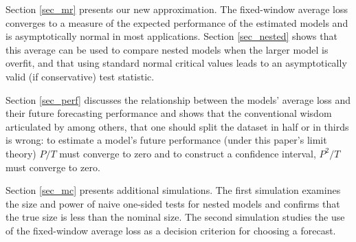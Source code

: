 \documentclass[11pt]{article} \def\baselinestretch{1.08}
\newcommand{\pp}[1]{#1} \newcommand{\intro}[1]{#1}
\begin{document}
\pp{Section \ref{sec_mr} presents our new approximation.}  
The fixed-window average loss converges to a measure of the expected
performance of the estimated models and is asymptotically normal
in most applications. Section \ref{sec_nested} shows that this average
can be used to compare nested models when the larger model is overfit, and that
using standard normal critical values leads to an asymptotically valid
(if conservative) test statistic.  

Section \ref{sec_perf} discusses the relationship between the
models' average loss and their future forecasting performance and
 shows that the conventional wisdom articulated by
  among others, that one should split
 the dataset in  half or in thirds is wrong: to estimate a model's
 future performance (under this paper's limit theory) $P/T$ must
 converge to zero and to construct a confidence interval, $P^2/T$ must
 converge to zero.

\pp{Section \ref{sec_mc} presents additional simulations.  The first
  simulation examines the size and power of naive one-sided tests for
  nested models and confirms that the true size is less than the
  nominal size.  The second simulation studies the use of the
  fixed-window average loss as a decision criterion for choosing a
  forecast.}

\end{document}
